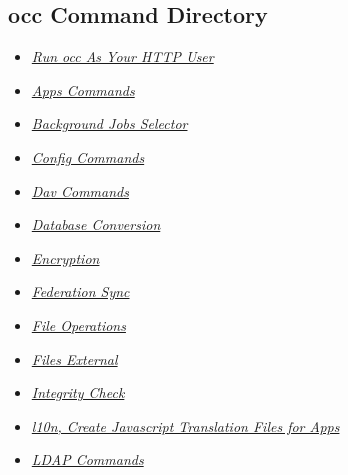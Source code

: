 \documentclass[letterpaper,10pt,english]{sphinxmanual}
\begin{document}
\subsection{occ Command Directory}
\label{configuration_server/occ_command:occ-command-directory}\begin{itemize}
\item {} 
{\hyperref[configuration_server/occ_command:http-user-label]{\emph{Run occ As Your HTTP User}}}

\item {} 
{\hyperref[configuration_server/occ_command:apps-commands-label]{\emph{Apps Commands}}}

\item {} 
{\hyperref[configuration_server/occ_command:background-jobs-selector-label]{\emph{Background Jobs Selector}}}

\item {} 
{\hyperref[configuration_server/occ_command:config-commands-label]{\emph{Config Commands}}}

\item {} 
{\hyperref[configuration_server/occ_command:dav-label]{\emph{Dav Commands}}}

\item {} 
{\hyperref[configuration_server/occ_command:database-conversion-label]{\emph{Database Conversion}}}

\item {} 
{\hyperref[configuration_server/occ_command:encryption-label]{\emph{Encryption}}}

\item {} 
{\hyperref[configuration_server/occ_command:federation-sync-label]{\emph{Federation Sync}}}

\item {} 
{\hyperref[configuration_server/occ_command:file-operations-label]{\emph{File Operations}}}

\item {} 
{\hyperref[configuration_server/occ_command:files-external-label]{\emph{Files External}}}

\item {} 
{\hyperref[configuration_server/occ_command:integrity-check-label]{\emph{Integrity Check}}}

\item {} 
{\hyperref[configuration_server/occ_command:create-javascript-translation-files-label]{\emph{l10n, Create Javascript Translation Files for Apps}}}

\item {} 
{\hyperref[configuration_server/occ_command:ldap-commands-label]{\emph{LDAP Commands}}}


\end{itemize}
\end{document}
